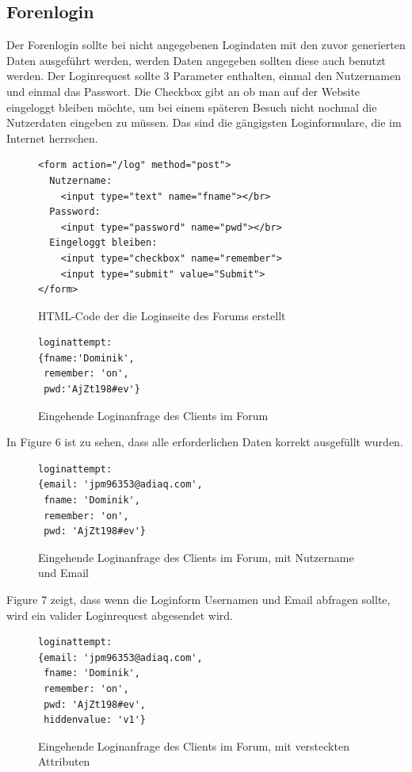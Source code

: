 \subsection{Forenlogin}
Der Forenlogin sollte bei nicht angegebenen Logindaten mit den zuvor generierten Daten ausgeführt werden, werden Daten angegeben sollten diese auch benutzt werden. Der Loginrequest sollte 3 Parameter enthalten, einmal den Nutzernamen und einmal das Passwort. Die Checkbox gibt an ob man auf der Website eingeloggt bleiben möchte, um bei einem späteren Besuch nicht nochmal die Nutzerdaten eingeben zu müssen. Das sind die gängigsten Loginformulare, die im Internet herrschen.

\begin{figure}[ht]
\begin{lstlisting}[language=HTML5]
<form action="/log" method="post">
  Nutzername: 
    <input type="text" name="fname"></br>
  Password: 
    <input type="password" name="pwd"></br>
  Eingeloggt bleiben: 
    <input type="checkbox" name="remember">
    <input type="submit" value="Submit">
</form>
\end{lstlisting}
\caption{HTML-Code der die Loginseite des Forums erstellt}
\end{figure}
\newpage

\begin{figure}[h!]
\begin{lstlisting}[language=HTML5]
loginattempt: 
{fname:'Dominik',
 remember: 'on',
 pwd:'AjZt198#ev'}
\end{lstlisting}
\caption{Eingehende Loginanfrage des Clients im Forum}
\end{figure}

In Figure 6 ist zu sehen, dass alle erforderlichen Daten korrekt ausgefüllt wurden.

\begin{figure}[h!]
\begin{lstlisting}[language=HTML5]
loginattempt:
{email: 'jpm96353@adiaq.com',
 fname: 'Dominik',
 remember: 'on',
 pwd: 'AjZt198#ev'}
\end{lstlisting}
\caption{Eingehende Loginanfrage des Clients im Forum, mit Nutzername und Email}
\end{figure}
Figure 7 zeigt, dass wenn die Loginform Usernamen und Email abfragen sollte, wird ein valider Loginrequest abgesendet wird.

\begin{figure}[h!]
\begin{lstlisting}[language=HTML5]
loginattempt:
{email: 'jpm96353@adiaq.com',
 fname: 'Dominik',
 remember: 'on',
 pwd: 'AjZt198#ev',
 hiddenvalue: 'v1'}
\end{lstlisting}
\caption{Eingehende Loginanfrage des Clients im Forum, mit versteckten Attributen}
\end{figure}

